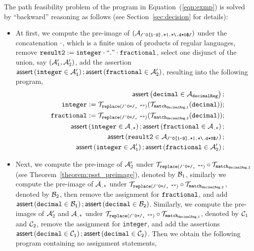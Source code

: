 The path feasibility problem of the program in Equation~(\ref{eqn:exmp}) is solved by ``backward'' reasoning as follows (see Section~\ref{sec:decision} for details):  
\begin{itemize}
\item At first, we compute the pre-image of $(\mathcal{A}_{\scriptsize\mbox{\tt /\^{}0[1-9].*|.*{\scriptsize\textbackslash}.d*0\$/}})$ under the concatenation $\cdot$, which is a finite union of products of regular languages, remove $\tt result2 := integer \cdot ``." \cdot fractional$, select one disjunct of the union, say $(\mathcal{A}'_1, \mathcal{A}'_2)$, add the assertion $\textsf{assert}\left(\tt integer \in \mathcal{A}'_1\right);\textsf{assert}\left(\tt fractional \in \mathcal{A}'_2\right)$, resulting into the following program,
\begin{eqnarray}\label{eqn:exmp-2}
& & \textsf{assert}\left(\tt decimal \in \mathcal{A}_{decimalReg}\right);\nonumber \\
& & \tt integer  := \tt  \mathcal{T}_{\tt replace(\mbox{\scriptsize \tt /\^{}0+/, ""})}(\mathcal{T}_{\tt match_{decimalReg,1}}(decimal));\nonumber \\
& & \tt fractional  := \tt  \mathcal{T}_{\scriptsize\tt replace(\mbox{\tt /\^{}0+/, ""})}(\mathcal{T}_{\tt match_{decimalReg,2}}(decimal));\nonumber \\
&&  \textsf{assert}\left(\tt integer \in \mathcal{A}_{\scriptsize\mbox{\tt.+}}\right); 
  \textsf{assert}\left(\tt fractional \in \mathcal{A}_{\scriptsize\mbox{\tt.+}}\right); \nonumber\\
 && \textsf{assert}\left(\tt result2 \in \mathcal{A}_{\scriptsize\mbox{\tt /\^{}0[1-9].*|.*{\scriptsize\textbackslash}.d*0\$/}}\right); \nonumber\\
  && \textsf{assert}\left(\tt integer \in \mathcal{A}'_1\right);\textsf{assert}\left(\tt fractional \in \mathcal{A}'_2\right); 
\end{eqnarray}
%
\item Next, we compute the pre-image of $\mathcal{A}'_2$ under $\mathcal{T}_{\tt replace(\mbox{\scriptsize \tt /\^{}0+/, ""})} \circ \mathcal{T}_{\tt match_{decimalReg,2}}$ (see Theorem~\ref{theorem:psst_preimage}), denoted by $\mathcal{B}_1$, similarly we compute the pre-image of $\mathcal{A}_{\scriptsize\mbox{\tt.+}}$ under $\mathcal{T}_{\tt replace(\mbox{\scriptsize \tt /\^{}0+/, ""})} \circ \mathcal{T}_{\tt match_{decimalReg,2}}$,  denoted by $\mathcal{B}_2$, then remove the assignment for  $\tt fractional$, and add $\textsf{assert}\left(\tt decimal \in \mathcal{B}_1\right);\textsf{assert}\left(\tt decimal \in \mathcal{B}_2\right)$. Similarly, we compute the pre-images of $\mathcal{A}'_2$ and $\mathcal{A}_{\scriptsize\mbox{\tt.+}}$ under $\mathcal{T}_{\tt replace(\mbox{\scriptsize \tt /\^{}0+/, ""})} \circ \mathcal{T}_{\tt match_{decimalReg, 1}}$, denoted by $\mathcal{C}_1$ and $\mathcal{C}_2$, remove the assignment for {\tt integer}, and add the assertions $\textsf{assert}\left(\tt decimal \in \mathcal{C}_1\right);\textsf{assert}\left(\tt decimal \in \mathcal{C}_2\right)$. Then we obtain the following program containing no assignment statements, 

\end{itemize}
